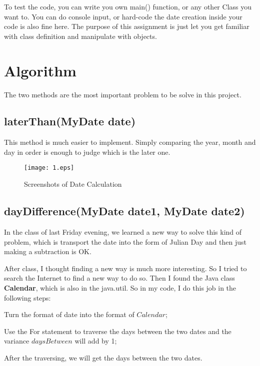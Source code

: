 \documentclass{article}
\begin{document}
To test the code, you can write you own main() function, or any other Class you want to. You can do console input, or hard-code the date creation inside your code is also fine here. The purpose of this assignment is just let you get familiar with class definition and manipulate with objects.



\section{Algorithm}

The two methods are the most important problem to be solve in this project.
\subsection{laterThan(MyDate date)}
This method is much easier to implement. Simply comparing the year, month and day in order is enough to judge which is the later one.
\begin{figure}[h]
\centering
\texttt{[image: 1.eps]}
\caption{Screenshots of Date Calculation}
\end{figure}
\subsection{dayDifference(MyDate date1, MyDate date2)}
In the class of last Friday evening, we learned a new way to solve this kind of problem, which is transport the date into the form of Julian Day and then just making a subtraction is OK.

After class, I thought finding a new way is much more interesting. So I tried to search the Internet to find a new way to do so. Then I found the Java class \textbf{Calendar}, which is also in the java.util. So in my code, I do this job in the following steps:
\begin{compactitem}
\item Turn the format of date into the format of $Calendar$;
\item Use the For statement to traverse the days between the two dates and the variance $daysBetween$ will add by 1;
\item After the traversing, we will get the days between the two dates.
\end{compactitem}
\end{document}
